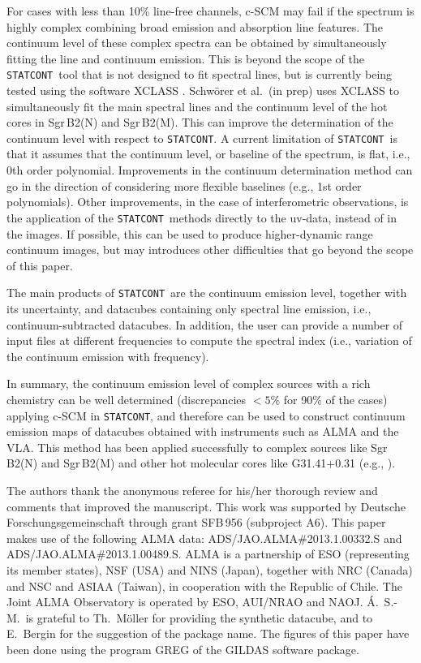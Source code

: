 \documentclass{aa}
\newcommand{\statcont} {\texttt{STATCONT}}
\begin{document}
For cases with less than 10\% line-free channels, c-SCM may fail if the spectrum is highly complex combining broad emission and absorption line features. The continuum level of these complex spectra can be obtained by simultaneously fitting the line and continuum emission. This is beyond the scope of the \statcont\ tool that is not designed to fit spectral lines, but is currently being tested using the software XCLASS \citep{Moeller2017}. Schw\"orer et al.\ (in prep) uses XCLASS to simultaneously fit the main spectral lines and the continuum level of the hot cores in Sgr\,B2(N) and Sgr\,B2(M). This can improve the determination of the continuum level with respect to \statcont. A current limitation of \statcont\ is that it assumes that the continuum level, or baseline of the spectrum, is flat, i.e., 0th order polynomial. Improvements in the continuum determination method can go in the direction of considering more flexible baselines (e.g., 1st order polynomials). Other improvements, in the case of interferometric observations, is the application of the \statcont\ methods directly to the uv-data, instead of in the images. If possible, this can be used to produce higher-dynamic range continuum images, but may introduces other difficulties that go beyond the scope of this paper.

The main products of \statcont\ are the continuum emission level, together with its uncertainty, and datacubes containing only spectral line emission, i.e., continuum-subtracted datacubes. In addition, the user can provide a number of input files at different frequencies to compute the spectral index (i.e., variation of the continuum emission with frequency).

In summary, the continuum emission level of complex sources with a rich chemistry can be well determined (discrepancies $<5$\% for 90\% of the cases) applying c-SCM in \statcont, and therefore can be used to construct continuum emission maps of datacubes obtained with instruments such as ALMA and the VLA. This method has been applied successfully to complex sources like Sgr\,B2(N) and Sgr\,B2(M) and other hot molecular cores like G31.41$+$0.31 (e.g., \citealt{SanchezMonge2017, Cesaroni2017}).


\begin{acknowledgements}
The authors thank the anonymous referee for his/her thorough review and comments that improved the manuscript. This work was supported by Deutsche Forschungsgemeinschaft through grant SFB\,956 (subproject A6). This paper makes use of the following ALMA data: ADS/JAO.ALMA\#2013.1.00332.S and ADS/JAO.ALMA\#2013.1.00489.S. ALMA is a partnership of ESO (representing its member states), NSF (USA) and NINS (Japan), together with NRC (Canada) and NSC and ASIAA (Taiwan), in cooperation with the Republic of Chile. The Joint ALMA Observatory is operated by ESO, AUI/NRAO and NAOJ. \'A.\ S.-M.\ is grateful to Th.\ M\"oller for providing the synthetic datacube, and to E.\ Bergin for the suggestion of the package name. The figures of this paper have been done using the program GREG of the GILDAS software package.
\end{acknowledgements}
\end{document}
